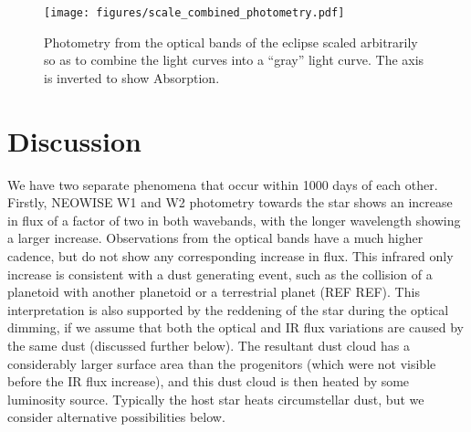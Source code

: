 \documentclass{aa}
\newcommand{\asas}{ASASSN-21qj}
\begin{document}
\begin{figure*}
   \begin{centering}
   \texttt{[image: figures/scale\_combined\_photometry.pdf]}
      \caption{Photometry from the optical bands of the eclipse scaled arbitrarily so as to combine the light curves into a ``gray'' light curve.
      The axis is inverted to show Absorption.
              }
              \label{fig:allphot}
              \end{centering}
       \end{figure*}



\section{Discussion}\label{sec:discussion}

We have two separate phenomena that occur within 1000 days of each other.
%
Firstly, NEOWISE W1 and W2 photometry towards the star shows an increase in flux of a factor of two in both wavebands, with the longer wavelength showing a larger increase.
%
Observations from the optical bands have a much higher cadence, but do not show any corresponding increase in flux.
%
This infrared only increase is consistent with a dust generating event, such as the collision of a planetoid with another planetoid or a terrestrial planet (REF REF).
%
This interpretation is also supported by the reddening of the star during the optical dimming, if we assume that both the optical and IR flux variations are caused by the same dust (discussed further below).
%
The resultant dust cloud has a considerably larger surface area than the progenitors (which were not visible before the IR flux increase), and this dust cloud is then heated by some luminosity source.
%
Typically the host star heats circumstellar dust, but we consider alternative possibilities below.
%

\end{document}
